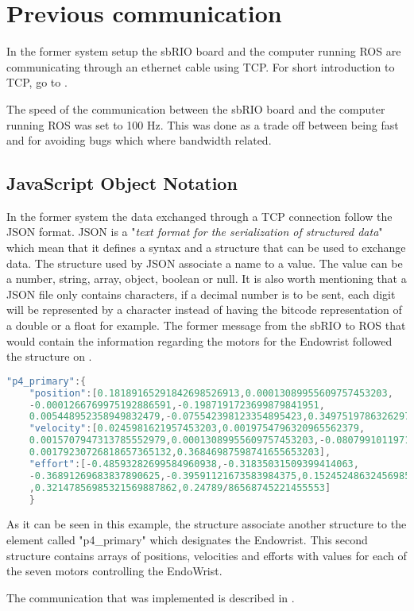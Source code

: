

 \section{Previous communication}\label{sec:prev_communication}
In the former system setup the sbRIO board and the computer running ROS are communicating through an ethernet cable using TCP. For short introduction to TCP, go to .

The speed of the communication between the sbRIO board and the computer running ROS was set to 100 Hz. This was done as a trade off between being fast and for avoiding bugs which where bandwidth related\cite{Chris_Surgical}.

\subsection{JavaScript Object Notation}\label{subsec:JSON}
In the former system the data exchanged through a TCP connection follow the \gls{JSON} format. \gls{JSON} is a "\textit{text format for the serialization of structured data}"\cite{JSON_IETF} which mean that it defines a syntax and a structure that can be used to exchange data. The structure used by \gls{JSON} associate a name to a value. The value can be a number, string, array, object, boolean or null. It is also worth mentioning that a \gls{JSON} file only contains characters, if a decimal number is to be sent, each digit will be represented by a character instead of having the bitcode representation of a double or a float for example. The former message from the sbRIO to ROS that would contain the information regarding the motors for the Endowrist followed the structure on .

\begin{lstlisting}[caption={Example of the previous JASON string.},label={JSON_lst},language=C]
"p4_primary":{
	"position":[0.18189165291842698526913,0.00013089955609757453203,
	-0.0001266769975192886591,-0.1987191723699879841951,
	0.005448952358949832479,-0.075542398123354895423,0.34975197863262971333179],
	"velocity":[0.0245981621957453203,0.0019754796320965562379,
	0.0015707947313785552979,0.00013089955609757453203,-0.08079910119712697,
	0.00179230726818657365132,0.36846987598741655653203],
	"effort":[-0.48593282699584960938,-0.31835031509399414063,
	-0.36891269683837890625,-0.39591121673583984375,0.15245248632456985325663
	,0.32147856985321569887862,0.24789/86568745221455553]
	}

\end{lstlisting}

As it can be seen in this example, the structure associate another structure to the element called "p4\_primary" which designates the Endowrist. This second structure contains arrays of positions, velocities and efforts with values for each of the seven motors controlling the EndoWrist.

The communication that was implemented is described in .%